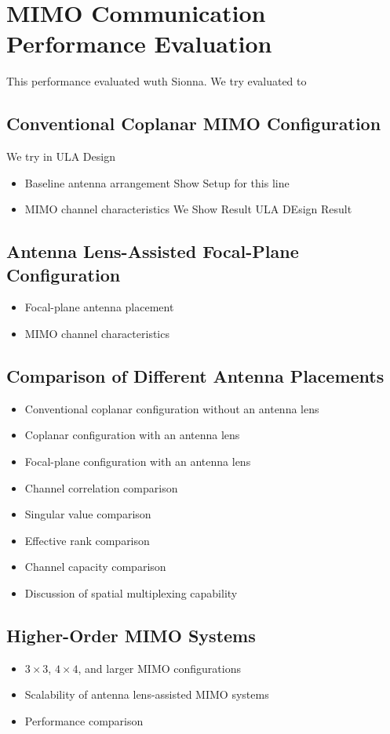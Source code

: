 \chapter{MIMO Communication Performance Evaluation}
This performance evaluated wuth Sionna. We try evaluated to 
\section{Conventional Coplanar MIMO Configuration}
We try in ULA Design
\begin{itemize}
    \item Baseline antenna arrangement
	Show Setup for this line
    \item MIMO channel characteristics
	We Show Result ULA DEsign Result
\end{itemize}

\section{Antenna Lens-Assisted Focal-Plane Configuration}
\begin{itemize}
    \item Focal-plane antenna placement
    \item MIMO channel characteristics
\end{itemize}

\section{Comparison of Different Antenna Placements}
\begin{itemize}
    \item Conventional coplanar configuration without an antenna lens
    \item Coplanar configuration with an antenna lens
    \item Focal-plane configuration with an antenna lens
    \item Channel correlation comparison
    \item Singular value comparison
    \item Effective rank comparison
    \item Channel capacity comparison
    \item Discussion of spatial multiplexing capability
\end{itemize}

\section{Higher-Order MIMO Systems}
\begin{itemize}
    \item $3\times3$, $4\times4$, and larger MIMO configurations
    \item Scalability of antenna lens-assisted MIMO systems
    \item Performance comparison
\end{itemize}

